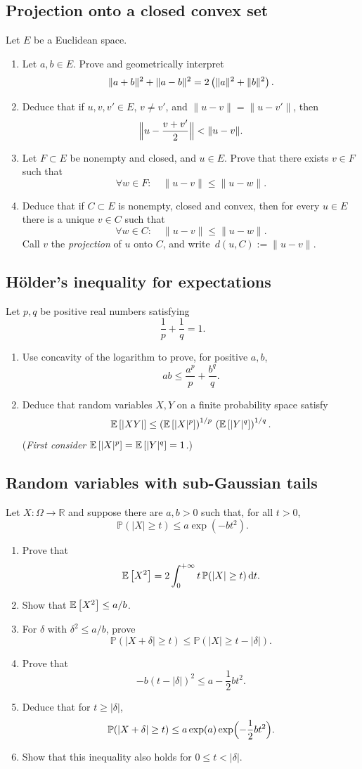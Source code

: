 \documentclass[a4paper]{report}
\begin{document}
\subsection{Projection onto a closed convex set}
Let \(E\) be a Euclidean space.
\begin{enumerate}
\item Let \(a,b\in E\). Prove and geometrically interpret
  \[
  \|a+b\|^2+\|a-b\|^2 = 2\left ( \|a\|^2 + \|b\|^2 \right ).
  \]
\item Deduce that if \(u,v,v'\in E\), \(v\ne v'\), and \(\|u-v\|=\|u-v'\|\), then
  \[
  \Bigl\|u-\frac{v+v'}{2}\Bigr\| < \|u-v\|.
  \]
\item Let \(F\subset E\) be nonempty and closed, and \(u\in E\). Prove that there exists \(v\in F\) such that
  \[
  \forall w\in F:\quad \|u-v\|\le \|u-w\|.
  \]
\item Deduce that if \(C\subset E\) is nonempty, closed and convex, then for every \(u\in E\) there is a unique \(v\in C\) such that
  \[
  \forall w\in C:\quad \|u-v\|\le \|u-w\|.
  \]
Call \(v\) the \emph{projection} of \(u\) onto \(C\), and write
  \(\,d(u,C):=\|u-v\|\).
\end{enumerate}

\subsection{H\"older's inequality for expectations}
Let \(p,q\) be positive real numbers satisfying
\[
\frac{1}{p} + \frac{1}{q} = 1.
\]
\begin{enumerate}
\item Use concavity of the logarithm to prove, for positive \(a,b\),
  \[
  ab \le \frac{a^p}{p} + \frac{b^q}{q}.
  \]
\item Deduce that random variables \(X,Y\) on a finite probability space satisfy
  \[
  \mathbb {E}\left[ |XY|\right]\le \left ( \mathbb {E}\left[ |X|^p\right] \right )^{1/p}\,
  \left ( \mathbb {E}\left[ |Y|^q\right] \right )^{1/q}.
  \]
(\emph{First consider $\mathbb {E}\left[ |X|^p\right]=\mathbb {E}\left[ |Y|^q\right]=1$.})
\end{enumerate}


\subsection{Random variables with sub-Gaussian tails}
Let \(X:\Omega\to\mathbb R\) and suppose there are \(a,b>0\) such that, for all \(t>0\),
\[
\mathbb{P}(|X|\ge t)\le a\exp(-bt^2).
\]
\begin{enumerate}
\item Prove that
  \[
  \mathbb {E}\left[ X^2\right]
  = 2\int_{0}^{+\infty} t\,\mathbb{P}(|X|\ge t)\,{\mathrm{d}} t.
  \]
\item Show that \(\mathbb {E}\left[ X^2\right]\leq a/b\).
\item For \(\delta\) with \(\delta^2\leq a/b\), prove
  \[
  \mathbb{P}(|X+\delta|\ge t)\le \mathbb{P}(|X|\ge t-|\delta|).
  \]
\item Prove that
  \[
  -b(t-|\delta|)^2 \le a - \frac12bt^2.
  \]
\item Deduce that for \(t\geq|\delta|\),
  \[
  \mathbb{P}(|X+\delta|\ge t)
  \le a\exp(a)\exp\Bigl(-\frac12bt^2\Bigr).
  \]
\item Show that this inequality also holds for \(0\leq t<|\delta|\).
\end{enumerate}
\end{document}
